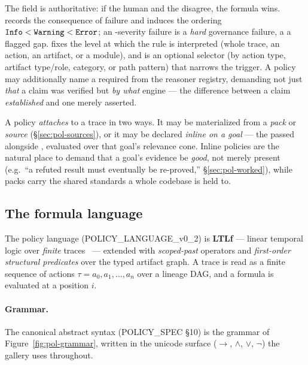 \noindent The  field is authoritative: if the human
 and the  disagree, the formula wins.
 records the consequence of failure and induces the ordering
\(\code{Info} < \code{Warning} < \code{Error}\); an -severity
failure is a \emph{hard} governance failure, a  a flagged gap.
 fixes the level at which the rule is interpreted (whole trace, an
action, an artifact, or a module), and  is an optional
selector (by action type, artifact type/role, category, or path pattern) that
narrows the trigger. A policy may additionally name a required 
from the reasoner registry, demanding not just \emph{that} a claim was verified
but \emph{by what} engine --- the difference between a claim \emph{established}
and one merely asserted.

A policy \emph{attaches} to a trace in two ways. It may be materialized from a
\emph{pack} or \emph{source} (\S\ref{sec:pol-sources}), or it may be declared
\emph{inline on a goal} --- the  passed alongside
, evaluated over that goal's relevance cone. Inline policies
are the natural place to demand that a goal's evidence be \emph{good}, not merely
present (e.g.\ ``a refuted result must eventually be re-proved,''
\S\ref{sec:pol-worked}), while packs carry the shared standards a whole codebase
is held to.

\subsection{The formula language}\label{sec:pol-language}

The policy language (POLICY\_LANGUAGE\_v0\_2) is \textbf{LTLf} --- linear
temporal logic over \emph{finite} traces~\cite{ltl} --- extended with
\emph{scoped-past} operators and \emph{first-order structural predicates} over
the typed artifact graph. A trace is read as a finite sequence of actions
\(\tau = a_0, a_1, \ldots, a_n\) over a lineage DAG, and a formula is evaluated at
a position \(i\).

\paragraph{Grammar.}
The canonical abstract syntax (POLICY\_SPEC \S10) is the grammar of
Figure~\ref{fig:pol-grammar}, written in the unicode surface
(\(\to\), \(\land\), \(\lor\), \(\lnot\)) the gallery uses throughout.

